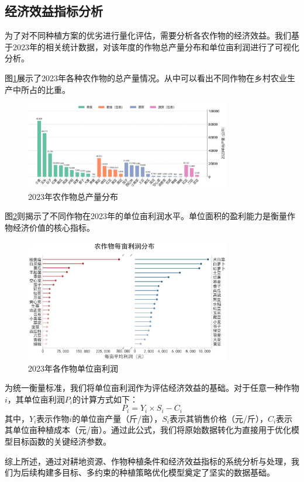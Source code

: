 \subsection{经济效益指标分析}

为了对不同种植方案的优劣进行量化评估，需要分析各农作物的经济效益。我们基于2023年的相关统计数据，对该年度的作物总产量分布和单位亩利润进行了可视化分析。

图\ref{fig:production_distribution_2023}展示了2023年各种农作物的总产量情况。从中可以看出不同作物在乡村农业生产中所占的比重。

\begin{figure}[htbp]
    \centering
    \includegraphics[width=0.8\textwidth]{figs/2数据分析与预处理/2023年产量分布.png}
    \caption{2023年农作物总产量分布}
    \label{fig:production_distribution_2023}
\end{figure}

图\ref{fig:profit_per_mu_2023}则揭示了不同作物在2023年的单位亩利润水平。单位面积的盈利能力是衡量作物经济价值的核心指标。

\begin{figure}[htbp]
    \centering
    \includegraphics[width=0.8\textwidth]{figs/2数据分析与预处理/2023年单位亩利润}
    \caption{2023年各作物单位亩利润}
    \label{fig:profit_per_mu_2023}
\end{figure}

为统一衡量标准，我们将单位亩利润作为评估经济效益的基础。对于任意一种作物$i$，其单位亩利润$P_i$的计算方式如下：
\begin{equation}
    P_i = Y_i \times S_i - C_i
    \label{eq:profit}
\end{equation}
其中，$Y_i$表示作物$i$的单位亩产量（斤/亩），$S_i$表示其销售价格（元/斤），$C_i$表示其单位亩种植成本（元/亩）。通过此公式，我们将原始数据转化为直接用于优化模型目标函数的关键经济参数。

综上所述，通过对耕地资源、作物种植条件和经济效益指标的系统分析与处理，我们为后续构建多目标、多约束的种植策略优化模型奠定了坚实的数据基础。
